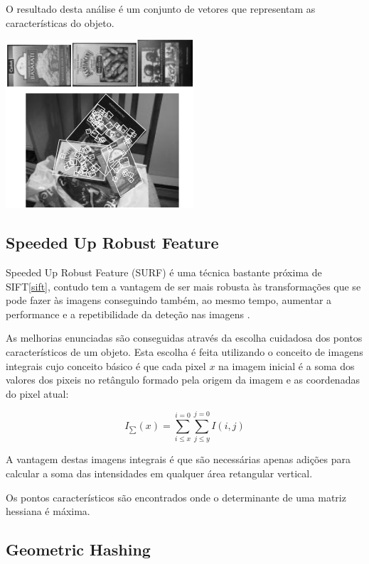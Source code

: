 O resultado desta análise é um conjunto de vetores que representam as
características do objeto. 


\begin{center}
	\includegraphics[scale=1.00]{figures/sift_img.png}
	\label{fig:1}
\end{center}

\subsection[SURF]{Speeded Up Robust Feature}

Speeded Up Robust Feature (SURF) é uma técnica bastante próxima de SIFT\ref{sift}, contudo tem a vantagem de ser mais robusta às transformações que se pode fazer às imagens conseguindo também, ao mesmo tempo, aumentar a performance e a repetibilidade da deteção nas imagens \cite{citeulike:973069}.

As melhorias enunciadas são conseguidas através da escolha cuidadosa dos pontos característicos de um objeto. Esta escolha é feita utilizando o conceito de imagens integrais \cite{10.1109CVPR.2001.990517} cujo conceito básico é que cada pixel $x$ na imagem inicial é a soma dos valores dos pixeis no retângulo formado pela origem da imagem e as coordenadas do pixel atual:

\[
I_\sum(x) = \sum_{i \leq x}^{i=0} \sum_{j \leq y}^{j=0} I(i,j)
\]


A vantagem destas imagens integrais é que são necessárias apenas adições
para calcular a soma das intensidades em qualquer área retangular vertical.

Os pontos característicos são encontrados onde o determinante de uma matriz
hessiana é máxima.


\subsection{Geometric Hashing}

